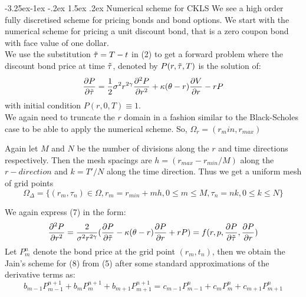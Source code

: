 \documentclass[11pt]{article}
\makeatletter
\renewcommand\subsection{\@startsection{subsection}{2}{\z@}%
                                         {-3.25ex\@plus -1ex \@minus -.2ex}%
                                         {1.5ex \@plus .2ex}%
                                         {\normalfont\fontfamily{phv}\fontsize{14}{17}\bfseries}}
\makeatother
\begin{document}
\subsection{Numerical scheme for CKLS}
We see a high order fully discretised scheme for pricing bonds and bond options.
We start with the numerical scheme for pricing a unit discount bond, that is a zero coupon bond with face value of one dollar.\\
We use the substitution $\Tilde{\tau} = T-t$ in (2) to get a forward problem where the discount bond price at time $\Tilde{\tau}$, denoted by $P(r,\Tilde{\tau}, T)$ is the solution of:
\begin{equation}
    \frac{\partial P}{\partial \Tilde{\tau}} = \frac{1}{2} \sigma^{2}r^{2\gamma}\frac{\partial^{2}P}{\partial r^{2}} + \kappa(\theta-r)\frac{\partial V}{\partial r} - rP
\end{equation}
 with initial condition $P(r,0,T)\equiv 1$.\\
 We again need to truncate the $r$ domain in a fashion similar to the Black-Scholes case to be able to apply the numerical scheme. So, $\Omega_{r} = (r_min, r_{max})$
 
 Again let $M$ and $N$ be the number of divisions along the $r$ and time directions respectively. Then the mesh spacings are $h=(r_{max}-r_{min}/M)$ along the $r-direction$ and $k=T'/N$ along the time direction. Thus we get a uniform mesh of grid points
\begin{equation*}
    \Omega_{\Delta} = \{(r_{m},\tau_{n}) \in \Omega, r_{m}=r_{min}+mh, 0\le m \le M, \tau_{n}=nk, 0\le k \le N\}
\end{equation*}
 
 We again express (7) in the form:
 \begin{equation}
     \frac{\partial^{2} P}{\partial r^{2}} = \frac{2}{\sigma^{2}r^{2\gamma}}(\frac{\partial P}{\partial \Tilde{\tau}}-\kappa(\theta-r)\frac{\partial P}{\partial r}+rP)\\
     =f(r,p,\frac{\partial P}{\partial \Tilde{\tau}}, \frac{\partial P}{\partial r})
 \end{equation}
Let $P_{m}^{n}$ denote the bond price at the grid point $(r_{m}, t_{n})$, then we obtain the Jain's scheme for (8) from (5) after some standard approximations of the derivative terms as:
\begin{equation}
    b_{m-1}P_{m-1}^{n+1}+b_{m}P_{m}^{n+1}+b_{m+1}P_{m+1}^{n+1} = c_{m-1}P_{m-1}^{n}+c_{m}P_{m}^{n}+c_{m+1}P_{m+1}^{n}
\end{equation}
\end{document}
